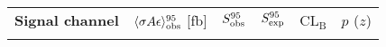 
{\renewcommand{\arraystretch}{1.3}
\begin{tabular*}{\textwidth}{@{\extracolsep{\fill}}lccccc}
\noalign{\smallskip}\hline\noalign{\smallskip}
{\bf Signal channel}                        & $\langle{\rm \sigma} A \epsilon\rangle_{\rm obs}^{95}$ [fb]  &  $S_{\rm obs}^{95}$  & $S_{\rm exp}^{95}$ & CL$_\mathrm{B}$ & $p$ ($z$)  \\
\noalign{\smallskip}\hline\noalign{\smallskip}



\end{tabular*}}
